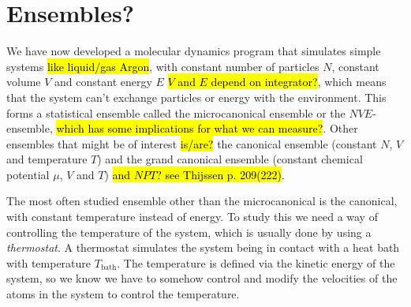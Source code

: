 \chapter{Ensembles?}

We have now developed a molecular dynamics program that simulates simple systems \hl{like liquid/gas Argon}, with constant number of particles $N$, constant volume $V$ and constant energy $E$ \hl{$V$ and $E$ depend on integrator?}, which means that the system can't exchange particles or energy with the environment. This forms a statistical ensemble called the microcanonical ensemble or the $NVE$-ensemble, \hl{which has some implications for what we can measure?}. Other ensembles that might be of interest \hl{is/are?} the canonical ensemble (constant $N$, $V$ and temperature $T$) and the grand canonical ensemble (constant chemical potential $\mu$, $V$ and $T$) \hl{and $NPT$? see Thijssen p. 209(222)}.


The most often studied ensemble other than the microcanonical is the canonical, with constant temperature instead of energy. To study this we need a way of controlling the temperature of the system, which is usually done by using a \emph{thermostat}. A thermostat simulates the system being in contact with a heat bath with temperature $T_\text{bath}$.  The temperature is defined via the kinetic energy of the system, so we know we have to somehow control and modify the velocities of the atoms in the system to control the temperature.


